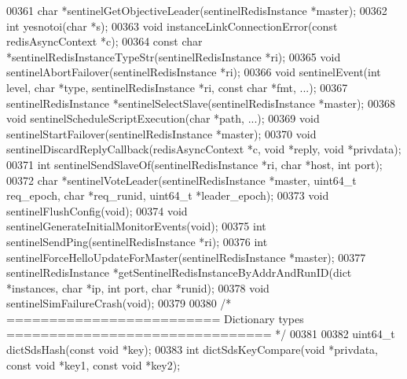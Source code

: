 \begin{DoxyCode}
00361 \textcolor{keywordtype}{char} *sentinelGetObjectiveLeader(sentinelRedisInstance *master);
00362 \textcolor{keywordtype}{int} yesnotoi(\textcolor{keywordtype}{char} *s);
00363 \textcolor{keywordtype}{void} instanceLinkConnectionError(\textcolor{keyword}{const} redisAsyncContext *c);
00364 \textcolor{keyword}{const} \textcolor{keywordtype}{char} *sentinelRedisInstanceTypeStr(sentinelRedisInstance *ri);
00365 \textcolor{keywordtype}{void} sentinelAbortFailover(sentinelRedisInstance *ri);
00366 \textcolor{keywordtype}{void} sentinelEvent(\textcolor{keywordtype}{int} level, \textcolor{keywordtype}{char} *type, sentinelRedisInstance *ri, \textcolor{keyword}{const} \textcolor{keywordtype}{char} *fmt, ...);
00367 sentinelRedisInstance *sentinelSelectSlave(sentinelRedisInstance *master);
00368 \textcolor{keywordtype}{void} sentinelScheduleScriptExecution(\textcolor{keywordtype}{char} *path, ...);
00369 \textcolor{keywordtype}{void} sentinelStartFailover(sentinelRedisInstance *master);
00370 \textcolor{keywordtype}{void} sentinelDiscardReplyCallback(redisAsyncContext *c, \textcolor{keywordtype}{void} *reply, \textcolor{keywordtype}{void} *privdata);
00371 \textcolor{keywordtype}{int} sentinelSendSlaveOf(sentinelRedisInstance *ri, \textcolor{keywordtype}{char} *host, \textcolor{keywordtype}{int} port);
00372 \textcolor{keywordtype}{char} *sentinelVoteLeader(sentinelRedisInstance *master, uint64\_t req\_epoch, \textcolor{keywordtype}{char} *req\_runid, uint64\_t 
      *leader\_epoch);
00373 \textcolor{keywordtype}{void} sentinelFlushConfig(\textcolor{keywordtype}{void});
00374 \textcolor{keywordtype}{void} sentinelGenerateInitialMonitorEvents(\textcolor{keywordtype}{void});
00375 \textcolor{keywordtype}{int} sentinelSendPing(sentinelRedisInstance *ri);
00376 \textcolor{keywordtype}{int} sentinelForceHelloUpdateForMaster(sentinelRedisInstance *master);
00377 sentinelRedisInstance *getSentinelRedisInstanceByAddrAndRunID(dict *instances, \textcolor{keywordtype}{char} *ip, \textcolor{keywordtype}{int} port, \textcolor{keywordtype}{
      char} *runid);
00378 \textcolor{keywordtype}{void} sentinelSimFailureCrash(\textcolor{keywordtype}{void});
00379 
00380 \textcolor{comment}{/* ========================= Dictionary types =============================== */}
00381 
00382 uint64\_t dictSdsHash(\textcolor{keyword}{const} \textcolor{keywordtype}{void} *key);
00383 \textcolor{keywordtype}{int} dictSdsKeyCompare(\textcolor{keywordtype}{void} *privdata, \textcolor{keyword}{const} \textcolor{keywordtype}{void} *key1, \textcolor{keyword}{const} \textcolor{keywordtype}{void} *key2);

\end{DoxyCode}
